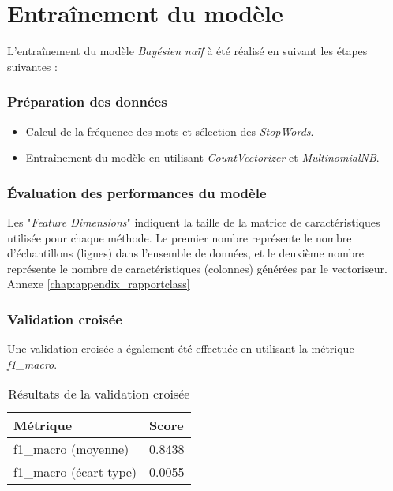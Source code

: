 \section{Entraînement du modèle}

L'entraînement du modèle \textit{Bayésien naïf} à été réalisé en suivant les étapes suivantes :

\subsubsection{Préparation des données}

\begin{itemize}
    \item Calcul de la fréquence des mots et sélection des \textit{StopWords}.
    \item Entraînement du modèle en utilisant \textit{CountVectorizer} et \textit{MultinomialNB}.
\end{itemize}

\subsubsection{Évaluation des performances du modèle}

Les "\textit{Feature Dimensions}" indiquent la taille de la matrice de caractéristiques utilisée pour chaque méthode. Le premier nombre représente le nombre d'échantillons (lignes) dans l'ensemble de données, et le deuxième nombre représente le nombre de caractéristiques (colonnes) générées par le vectoriseur.
Annexe \ref{chap:appendix_rapportclass}



\subsubsection{Validation croisée}

Une validation croisée a également été effectuée en utilisant la métrique \textit{f1\_macro}.

\begin{table}[h]
    \centering
    \begin{tabular}{|l|l|}
    \hline
    \textbf{Métrique} & \textbf{Score} \\ \hline
    f1\_macro (moyenne) & 0.8438 \\ \hline
    f1\_macro (écart type) & 0.0055 \\ \hline
    \end{tabular}
    \caption{Résultats de la validation croisée}
\end{table}

